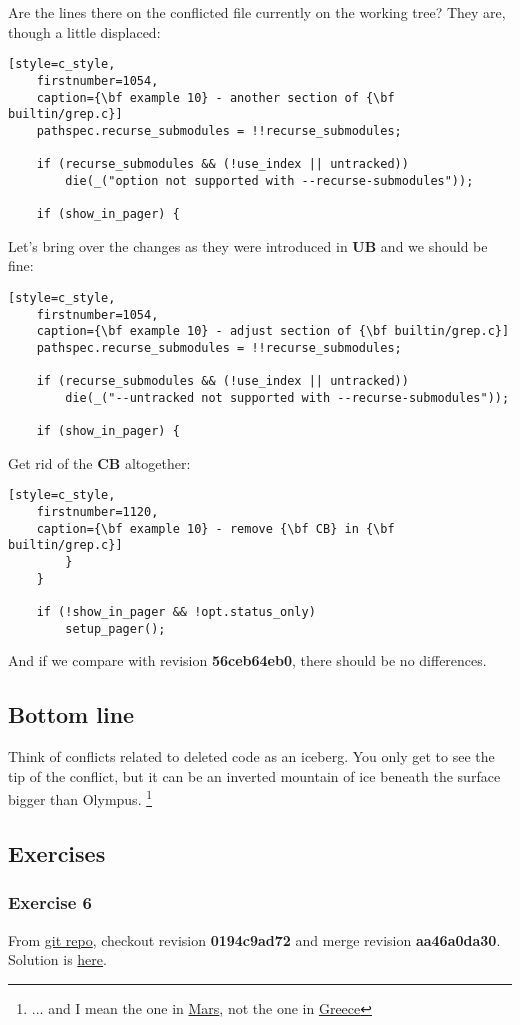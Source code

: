 Are the lines there on the conflicted file currently on the working tree? They are, though a little displaced:
\begin{lstlisting}[style=c_style,
	firstnumber=1054,
	caption={\bf example 10} - another section of {\bf builtin/grep.c}]
	pathspec.recurse_submodules = !!recurse_submodules;

	if (recurse_submodules && (!use_index || untracked))
		die(_("option not supported with --recurse-submodules"));

	if (show_in_pager) {
\end{lstlisting}

Let's bring over the changes as they were introduced in {\bf UB} and we should be fine:
\begin{lstlisting}[style=c_style,
	firstnumber=1054,
	caption={\bf example 10} - adjust section of {\bf builtin/grep.c}]
	pathspec.recurse_submodules = !!recurse_submodules;

	if (recurse_submodules && (!use_index || untracked))
		die(_("--untracked not supported with --recurse-submodules"));

	if (show_in_pager) {
\end{lstlisting}

Get rid of the {\bf CB} altogether:
\begin{lstlisting}[style=c_style,
	firstnumber=1120,
	caption={\bf example 10} - remove {\bf CB} in {\bf builtin/grep.c}]
		}
	}

	if (!show_in_pager && !opt.status_only)
		setup_pager();
\end{lstlisting}

And if we compare with revision {\bf 56ceb64eb0}, there should be no differences.

\subsection{Bottom line}
Think of conflicts related to deleted code as an iceberg. You only get to see the tip of the conflict, but it can be an
inverted mountain of ice beneath the surface bigger than Olympus.
\footnote{... and I mean the one in \href{https://en.wikipedia.org/wiki/Olympus_Mons}{Mars}, not the one in
\href{https://en.wikipedia.org/wiki/Mount_Olympus}{Greece}}

\subsection{Exercises}
\subsubsection{Exercise 6}
From \hyperref[git_repo]{git repo}, checkout revision {\bf 0194c9ad72} and merge revision {\bf aa46a0da30}. Solution is
\hyperref[exercise_06]{here}.

